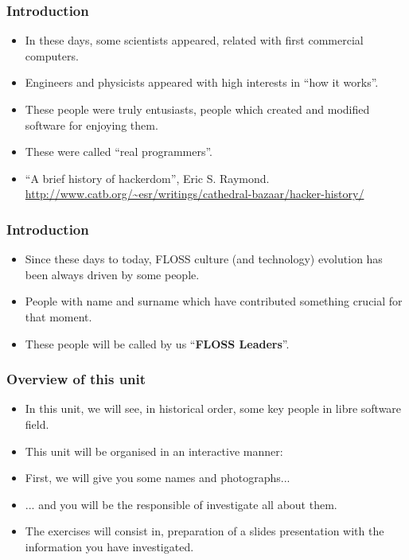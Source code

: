 \documentclass{beamer}
\begin{document}
\begin{frame}
\frametitle{Introduction}
\begin{itemize}
\item In these days, some scientists appeared, related with first commercial computers.
\pause
\item Engineers and physicists appeared with high interests in ``how it works''.
\pause
\item These people were truly entusiasts, people which created and modified software for enjoying them.
\pause
\item These were called ``real programmers''.
\item ``A brief history of hackerdom'', Eric S. Raymond.
\url{http://www.catb.org/~esr/writings/cathedral-bazaar/hacker-history/} 
\end{itemize}
\end{frame}

\begin{frame}
\frametitle{Introduction}
\begin{itemize}
\item Since these days to today, FLOSS culture (and technology) evolution has been always driven by some people.
\pause
\item People with name and surname which have contributed something crucial for that moment.
\pause
\item These people will be called by us ``{\bf FLOSS Leaders}''.
\end{itemize}
\end{frame}

\begin{frame}
\frametitle{Overview of this unit}
\begin{itemize}
\item In this unit, we will see, in historical order, some key people in libre software field.
\item This unit will be organised in an interactive manner:
\item First, we will give you some names and photographs...
\item ... and you will be the responsible of investigate all about them.
\item The exercises will consist in, preparation of a slides presentation with the information you have investigated.
\end{itemize}
\end{frame}
\end{document}
